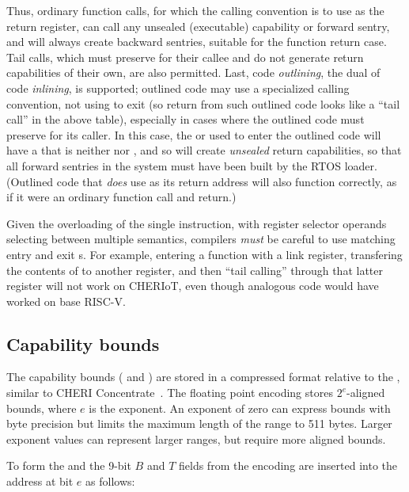Thus, ordinary function calls, for which the calling convention is to use  as the return register,
can call any unsealed (executable) capability or forward sentry,
and will always create backward sentries, suitable for the function return case.
Tail calls, which must preserve  for their callee and do not generate return capabilities of their own,
are also permitted.
Last, code \emph{outlining}, the dual of code \emph{inlining}, is supported;
outlined code may use a specialized calling convention, not using  to exit
(so return from such outlined code looks like a ``tail call'' in the above table),
especially in cases where the outlined code must preserve  for its caller.
In this case, the  or  used to enter the outlined code
will have a  that is neither  nor ,
and so will create \emph{unsealed} return capabilities,
so that all forward sentries in the system must have been built by the RTOS loader.
(Outlined code that \emph{does} use  as its return address will also function correctly,
as if it were an ordinary function call and return.)

Given the overloading of the single  instruction,
with register selector operands selecting between multiple semantics,
compilers \emph{must} be careful to use matching entry and exit s.
For example, entering a function with a  link register,
transfering the contents of  to another register,
and then ``tail calling'' through that latter register will not work on CHERIoT,
even though analogous code would have worked on base RISC-V.

\subsection{Capability bounds}
\label{sec:bounds}

The capability bounds (\cbase{} and \ctop{}) are stored in a compressed format relative to the \caddress{}, similar to CHERI Concentrate~\cite{Woodruff2019}.
The floating point encoding stores $2^e$-aligned bounds, where $e$ is the exponent.
An exponent of zero can express bounds with byte precision but limits the maximum length of the range to 511 bytes.
Larger exponent values can represent larger ranges, but require more aligned bounds.

To form the \cbase{} and \ctop{} the 9-bit $B$ and $T$ fields from the encoding are inserted into the address at bit $e$ as follows:

